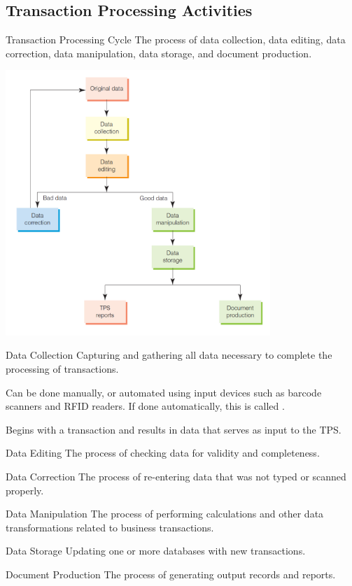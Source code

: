 \documentclass[\main/notes.tex]{subfiles}
\begin{document}
			\subsection{Transaction Processing Activities}
				\begin{definition}{Transaction Processing Cycle}
					The process of data collection, data editing, data correction, data manipulation, data storage, and document production.
					\begin{center}
						\includegraphics[width=0.75\textwidth]{chapter07/transaction_lifecycle.png}
					\end{center}
				\end{definition}
				\begin{definition}{Data Collection}
					Capturing and gathering all data necessary to complete the processing of transactions.

					Can be done manually, or automated using input devices such as barcode scanners and RFID readers. If done automatically, this is called .

					Begins with a transaction and results in data that serves as input to the TPS.
				\end{definition}
				\begin{definition}{Data Editing}
					The process of checking data for validity and completeness.
				\end{definition}
				\begin{definition}{Data Correction}
					The process of re-entering data that was not typed or scanned properly.
				\end{definition}
				\begin{definition}{Data Manipulation}
					The process of performing calculations and other data transformations related to business transactions.
				\end{definition}
				\begin{definition}{Data Storage}
					Updating one or more databases with new transactions.
				\end{definition}
				\begin{definition}{Document Production}
					The process of generating output records and reports.
				\end{definition}
	\vbox{}
\end{document}

